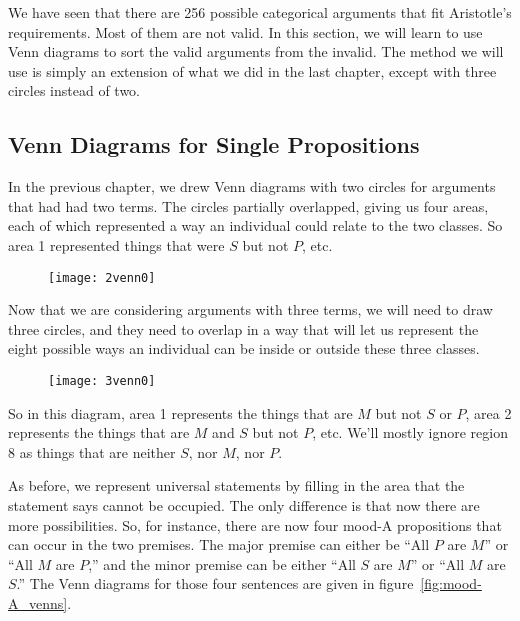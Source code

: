 We have seen that there are 256 possible categorical arguments that fit Aristotle's requirements. Most of them are not valid. In this section, we will learn to use Venn diagrams to sort the valid arguments from the invalid. The method we will use is simply an extension of what we did in the last chapter, except with three circles instead of two.

\subsection{Venn Diagrams for Single Propositions}

In the previous chapter, we drew Venn diagrams with two circles for arguments that had had two terms. The circles partially overlapped, giving us four areas, each of which represented a way an individual could relate to the two classes. So area 1 represented things that were $S$ but not $P$, etc.

\begin{figure}
\centering
\texttt{[image: 2venn0]}
\end{figure}

Now that we are considering arguments with three terms, we will need to draw three circles, and they need to overlap in a way that will let us represent the eight possible ways an individual can be inside or outside these three classes.

\begin{figure}
    \texttt{[image: 3venn0]}
\end{figure}

So in this diagram, area 1 represents the things that are $M$ but not $S$ or $P$, area 2 represents the things that are $M$ and $S$ but not $P$, etc. We'll mostly ignore region 8 as things that are neither $S$, nor $M$, nor $P$.

As before, we represent universal statements by filling in the area that the statement says cannot be occupied. The only difference is that now there are more possibilities. So, for instance, there are now four mood-A propositions that can occur in the two premises. The major premise can either be ``All $P$ are $M$'' or ``All $M$ are $P$,'' and the minor premise can be either ``All $S$ are $M$'' or ``All $M$ are $S$.'' The Venn diagrams for those four sentences are given in figure~\ref{fig:mood-A_venns}.


